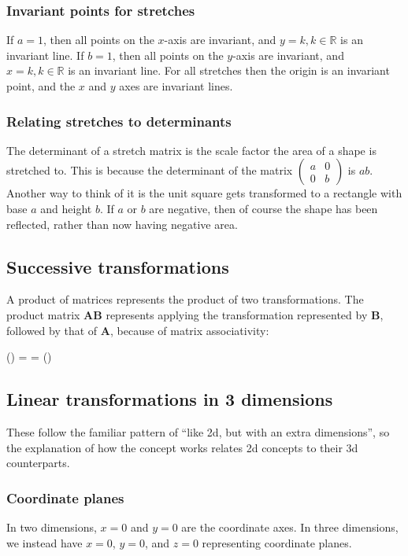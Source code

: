 \subsubsection{Invariant points for stretches}
If $a=1$, then all points on the $x$-axis are invariant, and $y=k,k \in \mathbb{R}$ is an invariant line. If $b=1$, then all points on the $y$-axis are invariant, and $x=k,k \in \mathbb{R}$ is an invariant line. For all stretches then the origin is an invariant point, and the $x$ and $y$ axes are invariant lines.

\subsubsection{Relating stretches to determinants}
The determinant of a stretch matrix is the scale factor the area of a shape is stretched to. This is because the determinant of the matrix $\begin{pmatrix}a & 0 \\ 0 & b \end{pmatrix}$ is $ab$. Another way to think of it is the unit square gets transformed to a rectangle with base $a$ and height $b$. If $a$ or $b$ are negative, then of course the shape has been reflected, rather than now having negative area.

\subsection{Successive transformations}
A product of matrices represents the product of two transformations. The product matrix $\mathbf{AB}$ represents applying the transformation represented by $\mathbf{B}$, followed by that of $\mathbf{A}$, because of matrix associativity:
\begin{ea}
	() =  = ()
\end{ea}

\subsection{Linear transformations in 3 dimensions}
These follow the familiar pattern of ``like 2d, but with an extra dimensions'', so the explanation of how the concept works relates 2d concepts to their 3d counterparts.

\subsubsection{Coordinate planes}
In two dimensions, $x=0$ and $y=0$ are the coordinate axes. In three dimensions, we instead have $x=0$, $y=0$, and $z=0$ representing coordinate planes.

